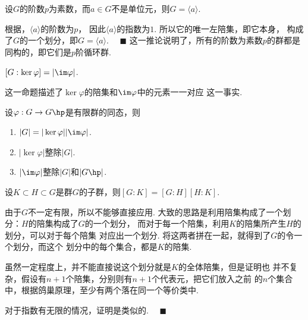   \begin{cor}
    \label{cor: 循环群、素数}
    设$G$的阶数$p$为素数，而$a\in G$不是单位元，则$G=\langle a\rangle$.
  \end{cor}
  \proof
    根据，$\langle a \rangle$的阶数为$p$，
    因此$\langle a\rangle$的指数为$1$. 所以它的唯一左陪集，即它本身，
    构成了$G$的一个划分，即$G=\langle a\rangle$. $\quad\blacksquare$
  \remark
    这一推论说明了，所有的阶数为素数$p$的群都是同构的，即它们是$p$阶循环群.

  \begin{pos}
    $[G:\ker\varphi] = |\im\varphi|$.
  \end{pos}
  \remark
    这一命题描述了$\ker\varphi$的陪集和$\im\varphi$中的元素一一对应
    这一事实.

  \begin{cor}
    \label{cor: 同态、核、像、阶}
    设$\varphi: G\to G\hp$是有限群的同态，则
    \begin{enumerate}
      \item $|G|=|\ker\varphi||\im\varphi|$.
      \item $|\ker\varphi|$整除$|G|$.
      \item $|\im\varphi|$整除$|G|$和$|G\hp|$.
    \end{enumerate}
  \end{cor}

  \begin{thm}[指数可乘性]
    设$K\subset H\subset G$是群$G$的子群，则$[G:K]=[G:H][H:K]$.
  \end{thm}
  \proof
    由于$G$不一定有限，所以不能够直接应用.
    大致的思路是利用陪集构成了一个划分：$H$的陪集构成了$G$的一个划分，
    而对于每一个陪集，利用$K$的陪集所产生$H$的划分，可以对于每个陪集
    对应出一个划分. 将这两者拼在一起，就得到了$G$的令一个划分，而这个
    划分中的每个集合，都是$K$的陪集.\par
    虽然一定程度上，并不能直接说这个划分就是$K$的全体陪集，但是证明也
    并不复杂，假设有$n+1$个陪集，分别则有$n+1$个代表元，把它们放入之前
    的$n$个集合中，根据鸽巢原理，至少有两个落在同一个等价类中.\par
    对于指数有无限的情况，证明是类似的.
    $\quad\blacksquare$

